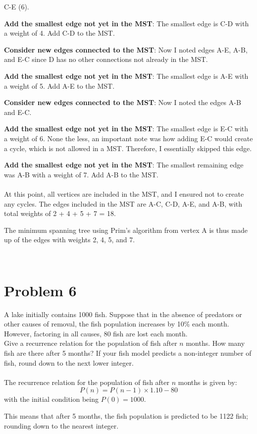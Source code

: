 \documentclass{amsart}
\theoremstyle{definition}
\theoremstyle{Exercise}
\theoremstyle{remark}
\theoremstyle{rule}
\numberwithin{equation}{section}
\begin{document}
	C-E (6). \item \textbf{Add the smallest edge not yet in the MST}: The smallest
	edge is C-D with a weight of 4. Add C-D to the MST. \item \textbf{Consider new
	edges connected to the MST}: Now I noted edges A-E, A-B, and E-C since D has
	no other connections not already in the MST. \item \textbf{Add the smallest
	edge not yet in the MST}: The smallest edge is A-E with a weight of 5. Add A-E
	to the MST. \item \textbf{Consider new edges connected to the MST}: Now I
	noted the edges A-B and E-C. \item \textbf{Add the smallest edge not yet in
	the MST}: The smallest edge is E-C with a weight of 6. None the less, an
	important note was how adding E-C would create a cycle, which is not allowed in
	a MST. Therefore, I essentially skipped this edge. \item \textbf{Add the
	smallest edge not yet in the MST}: The smallest remaining edge was A-B with a
	weight of 7. Add A-B to the MST.\\\\

	At this point, all vertices are included in the MST, and I ensured not to
	create any cycles. The edges included in the MST are A-C, C-D, A-E, and A-B, with
	total weights of 2 + 4 + 5 + 7 = 18.

	The minimum spanning tree using Prim's algorithm from vertex A is thus made up
	of the edges with weights 2, 4, 5, and 7.

	\newpage
	~\\
	\section*{Problem 6}
	A lake initially contains 1000 fish. Suppose that in the absence of predators
	or other causes of removal, the fish population increases by 10\% each month. However,
	factoring in all causes, 80 fish are lost each month.\\

	Give a recurrence relation for the population of fish after $n$ months. How many
	fish are there after 5 months? If your fish model predicts a non-integer
	number of fish, round down to the next lower integer. \\\\
	The recurrence relation for the population of fish after $n$ months is given by:
	\[
		P(n) = P(n-1) \times 1.10 - 80
	\]
	with the initial condition being $P(0) = 1000$.

	This means that after 5 months, the fish population is predicted to be 1122 fish;
	rounding down to the nearest integer. \\\\
\end{document}
